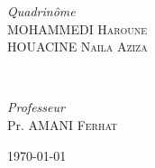 \begin{titlepage}
	\begin{minipage}{0.4\textwidth}
		\begin{flushleft}
			\large
			\textit{Quadrinôme}\\
			MOHAMMEDI \textsc{Haroune } %
			\\
			HOUACINE  \textsc{Naila Aziza} %
		\end{flushleft}
	\end{minipage}
	~
	\begin{minipage}{0.4\textwidth}
		\begin{flushright}
			\large
			\textit{Professeur}\\
			Pr. AMANI \textsc{Ferhat} %
		\end{flushright}
	\end{minipage}
	
	
	\vfill\vfill\vfill %
	
	{\large\today} %
	
	
	\vfill %
	
\end{titlepage}
